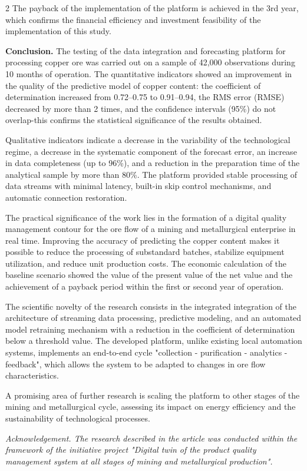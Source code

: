 \begin{multicols}{2}
The payback of the implementation of the platform is achieved in the 3rd
year, which confirms the financial efficiency and investment feasibility
of the implementation of this study.

{\bfseries Conclusion.} The testing of the data integration and forecasting platform
for processing copper ore was carried out on a sample of 42,000
observations during 10 months of operation. The quantitative indicators
showed an improvement in the quality of the predictive model of copper
content: the coefficient of determination increased from 0.72--0.75 to
0.91--0.94, the RMS error (RMSE) decreased by more than 2 times, and the
confidence intervals (95\%) do not overlap-this confirms the statistical
significance of the results obtained.

Qualitative indicators indicate a decrease in the variability of the
technological regime, a decrease in the systematic component of the
forecast error, an increase in data completeness (up to 96\%), and a
reduction in the preparation time of the analytical sample by more than
80\%. The platform provided stable processing of data streams with
minimal latency, built-in skip control mechanisms, and automatic
connection restoration.

The practical significance of the work lies in the formation of a
digital quality management contour for the ore flow of a mining and
metallurgical enterprise in real time. Improving the accuracy of
predicting the copper content makes it possible to reduce the processing
of substandard batches, stabilize equipment utilization, and reduce unit
production costs. The economic calculation of the baseline scenario
showed the value of the present value of the net value and the
achievement of a payback period within the first or second year of
operation.

The scientific novelty of the research consists in the integrated
integration of the architecture of streaming data processing, predictive
modeling, and an automated model retraining mechanism with a reduction
in the coefficient of determination below a threshold value. The
developed platform, unlike existing local automation systems, implements
an end-to-end cycle "collection - purification - analytics - feedback",
which allows the system to be adapted to changes in ore flow
characteristics.

A promising area of further research is scaling the platform to other
stages of the mining and metallurgical cycle, assessing its impact on
energy efficiency and the sustainability of technological processes.

\emph{Acknowledgement. The research described in the article was
conducted within the framework of the initiative project "Digital twin
of the product quality management system at all stages of mining and
metallurgical production".}
\end{multicols}

